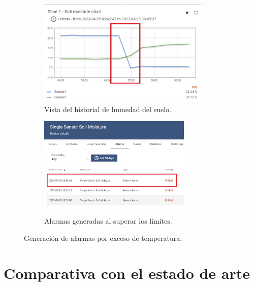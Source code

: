\begin{figure}[htpb]
     \centering
       \begin{subfigure}[b]{0.8\textwidth}
	    \centering
		 \includegraphics[width=0.9\textwidth]{./Figures/chapter4/soil_chart.jpg}
		\caption{Vista del historial de humedad del suelo.}
		\label{fig:temp_graph}
     \end{subfigure}
          \hfill
     \begin{subfigure}[b]{0.80\textwidth}
		\centering
		\includegraphics[width=0.80\textwidth]{./Figures/chapter4/soil_alarm.jpg}
		\caption{Alarmas generadas al superar los límites.}
		\label{fig:temp_alarm}
     \end{subfigure}
     \hfill
        \caption[Generación de alarmas por exceso de temperatura]{Generación de alarmas por exceso de temperatura.}
        \label{fig:tb_concurrencia}
\end{figure}


\section{Comparativa con el estado de arte}
\label{sec:Comparativa con el estado de arte}

